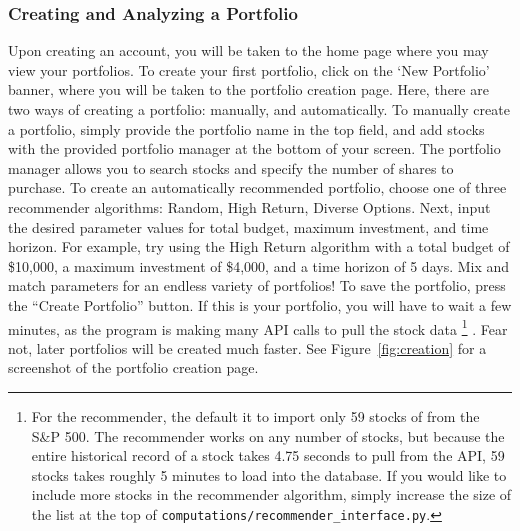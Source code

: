 \documentclass{article}
\begin{document}
\subsubsection{Creating and Analyzing a Portfolio}
Upon creating an account, you will be taken to the home page where you may view your portfolios. To create your first portfolio, click on the `New Portfolio' banner, where you will be taken to the portfolio creation page. Here, there are two ways of creating a portfolio: manually, and automatically. To manually create a portfolio, simply provide the portfolio name in the top field, and add stocks with the provided portfolio manager at the bottom of your screen. The portfolio manager allows you to search stocks and specify the number of shares to purchase. To create an automatically recommended portfolio, choose one of three recommender algorithms: Random, High Return, Diverse Options. Next, input the desired parameter values for total budget, maximum investment, and time horizon. For example, try using the High Return algorithm with a total budget of \$10,000, a maximum investment of \$4,000, and a time horizon of 5 days. Mix and match parameters for an endless variety of portfolios! To save the portfolio, press the ``Create Portfolio'' button. If this is your portfolio, you will have to wait a few minutes, as the program is making many API calls to pull the stock data
\footnote{For the recommender, the default it to import only 59 stocks of from the S\&P 500. The recommender works on any number of stocks, but because the entire historical record of a stock takes 4.75 seconds to pull from the API, 59 stocks takes roughly 5 minutes to load into the database. If you would like to include more stocks in the recommender algorithm, simply increase the size of the list at the top of \texttt{computations/recommender\_interface.py}.}
. Fear not, later portfolios will be created much faster. See Figure~\ref{fig:creation} for a screenshot of the portfolio creation page.
\end{document}
